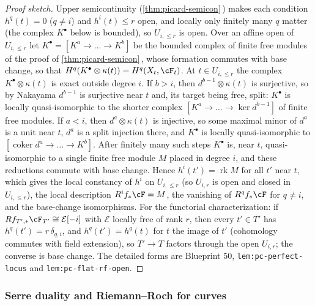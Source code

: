 \documentclass[11pt]{article}
\theoremstyle{plain}
\theoremstyle{definition}
\newcommand{\Cref}[1]{\hyperref[#1]{\ref{#1}}\,\hyperref[#1]{\nameref*{#1}}}
\begin{document}
\begin{proof}[Proof sketch]
Upper semicontinuity (\Cref{thm:picard-semicon}) makes each condition
$h^q(t)=0$ ($q\neq i$) and $h^i(t)\le r$ open, and locally only finitely
many $q$ matter (the complex $K^\bullet$ below is bounded), so
$U_{i,\le r}$ is open.  Over an affine open of $U_{i,\le r}$ let
$K^\bullet=[K^a\to\dots\to K^b]$ be the bounded complex of finite free
modules of the proof of \Cref{thm:picard-semicon}, whose formation
commutes with base change, so that
$H^q(K^\bullet\otimes\kappa(t))=H^q(X_t,\cF_t)$.  At $t\in U_{i,\le r}$
the complex $K^\bullet\otimes\kappa(t)$ is exact outside degree $i$.
If $b>i$, then $d^{b-1}\otimes\kappa(t)$ is surjective, so by Nakayama
$d^{b-1}$ is surjective near $t$ and, its target being free, split:
$K^\bullet$ is locally quasi-isomorphic to the shorter complex
$[K^a\to\dots\to\ker d^{b-1}]$ of finite free modules.  If $a<i$, then
$d^a\otimes\kappa(t)$ is injective, so some maximal minor of $d^a$ is a
unit near $t$, $d^a$ is a split injection there, and $K^\bullet$ is
locally quasi-isomorphic to $[\operatorname{coker}d^a\to\dots\to K^b]$.
After finitely many such steps $K^\bullet$ is, near $t$, quasi-isomorphic
to a single finite free module $M$ placed in degree $i$, and these
reductions commute with base change.  Hence $h^i(t')=\operatorname{rk}M$
for all $t'$ near $t$, which gives the local constancy of $h^i$ on
$U_{i,\le r}$ (so $U_{i,r}$ is open and closed in $U_{i,\le r}$), the
local description $R^if_*\cF=M$, the vanishing of $R^qf_*\cF$ for
$q\neq i$, and the base-change isomorphisms.  For the functorial
characterization: if $Rf_{T',*}\cF_{T'}\cong\mathcal E[-i]$ with $\mathcal E$ locally
free of rank $r$, then every $t'\in T'$ has $h^q(t')=r\,\delta_{q,i}$,
and $h^q(t')=h^q(t)$ for $t$ the image of $t'$ (cohomology commutes with
field extension), so $T'\to T$ factors through the open $U_{i,r}$; the
converse is base change.  The detailed forms are Blueprint 50,
\texttt{lem:pc-perfect-locus} and \texttt{lem:pc-flat-rf-open}.
\end{proof}

\subsubsection{Serre duality and Riemann--Roch for curves}
\end{document}
